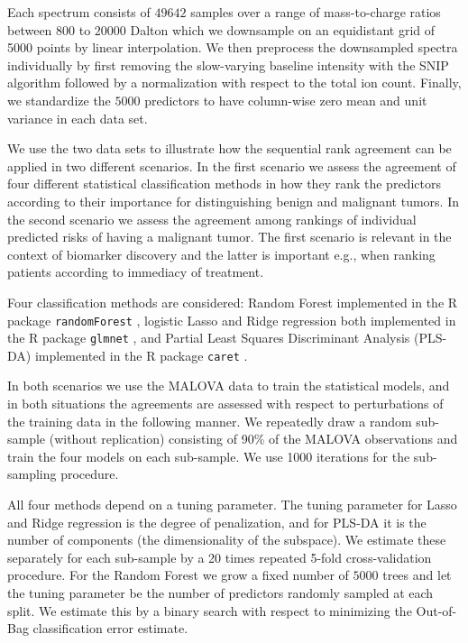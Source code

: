 \documentclass[12pt,a4paper]{article}
\theoremstyle{plain}
\begin{document}
Each spectrum consists of $49642$ samples over a range of mass-to-charge ratios
between $800$ to $20000$ Dalton which we downsample on an equidistant grid of
5000 points by linear interpolation. We then preprocess the downsampled
spectra individually by first removing the slow-varying baseline intensity
with the SNIP algorithm \citep{ryan1988snip} followed by a
normalization with respect to the total ion count. Finally, we standardize
the $5000$ predictors to have column-wise zero mean and unit variance in
each data set.

We use the two data sets to illustrate how the sequential rank
agreement can be applied in two different scenarios. In the first
scenario we assess the agreement of four different statistical
classification methods in how they rank the predictors according to
their importance for distinguishing benign and malignant tumors. In
the second scenario we assess the agreement among rankings of
individual predicted risks of having a malignant tumor. The first
scenario is relevant in the context of biomarker discovery and the
latter is important e.g., when ranking patients according to immediacy of
treatment.

Four classification methods are considered: Random Forest
\citep{breiman2001random} implemented in the R package
\texttt{randomForest} \citep{liaw2002classification}, logistic Lasso
\citep{tibshirani1996regression} and Ridge regression
\citep{segerstedt1992ordinary} both implemented in the R package
\texttt{glmnet} \citep{friedman2010regularization}, and Partial Least
Squares Discriminant Analysis (PLS-DA) \citep{boulesteix2004pls}
implemented in the R package \texttt{caret} \citep{Jed-Wing:2014aa}.

In both scenarios we use the MALOVA data to train the statistical
models, and in both situations the agreements are assessed with
respect to perturbations of the training data in the following
manner. We repeatedly draw a random sub-sample (without replication)
consisting of 90\% of the MALOVA observations and train the four
models on each sub-sample. We use 1000 iterations for the sub-sampling
procedure.

All four methods depend on a tuning parameter. The tuning parameter for
Lasso and Ridge regression is the degree of penalization, and for PLS-DA
it is the number of components (the dimensionality of the subspace).
We estimate these separately for each sub-sample by a 20 times repeated
5-fold cross-validation procedure. For the Random Forest we grow a fixed
number of $5000$ trees and let the tuning parameter be the number of
predictors randomly sampled at each split. We estimate this by a binary
search with respect to minimizing the Out-of-Bag classification error estimate.
\end{document}
